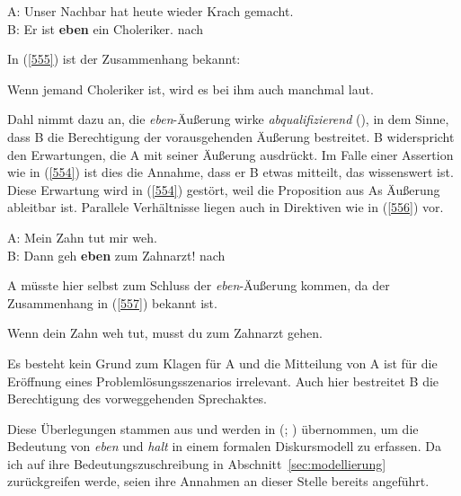 \begin{exe}
	\ex\label{554} 
	A: Unser Nachbar hat heute wieder Krach gemacht.\\
	B: Er ist \textbf{eben} ein Choleriker.		
	\hfill\hbox{nach \citet[98]{Dahl1988}} 
\end{exe}
In (\ref{555}) ist der Zusammenhang bekannt:
\begin{exe}
	\ex\label{555} 
	Wenn jemand Choleriker ist, wird es bei ihm auch manchmal laut.
\end{exe}
Dahl nimmt dazu an, die \textit{eben}-Äußerung wirke \textit{abqualifizierend} (\citeyear[100]{Dahl1988}), in dem Sinne, dass B die Berechtigung der vorausgehenden Äußerung bestreitet. B widerspricht den Erwartungen, die A mit seiner Äußerung ausdrückt. Im Falle einer Assertion wie in (\ref{554}) ist dies die Annahme, dass er B etwas mitteilt, das wissenswert ist. Diese Erwartung wird in (\ref{554}) gestört, weil die Proposition aus As Äußerung ableitbar ist. Parallele Verhältnisse liegen auch in Direktiven wie in (\ref{556}) vor.
\begin{exe}
	\ex\label{556} 
	A: Mein Zahn tut mir weh.\\
	B: Dann geh \textbf{eben} zum Zahnarzt!
	\hfill\hbox{nach \citet[101]{Dahl1988}} 
\end{exe}
A müsste hier selbst zum Schluss der \textit{eben}-Äußerung kommen, da der Zusammenhang in (\ref{557}) bekannt ist.
\begin{exe}
	\ex\label{557} 
	Wenn dein Zahn weh tut, musst du zum Zahnarzt gehen.
\end{exe}
Es besteht kein Grund zum Klagen für A und die Mitteilung von A ist für die Eröffnung eines Problemlösungsszenarios irrelevant. Auch hier bestreitet B die Berechtigung des vorweggehenden Sprechaktes.

Diese Überlegungen stammen aus \citet[98--101]{Dahl1988} und werden in \citeauthor{Karagjosova2003} (\citeyear[340]{Karagjosova2003}; \citeyear[202--220]{Karagjosova2004}) übernommen, um die Bedeutung von \textit{eben} und \textit{halt} in einem formalen Diskursmodell zu erfassen. Da ich auf ihre Bedeutungszuschreibung in Abschnitt~\ref{sec:modellierung} zurückgreifen werde, seien ihre Annahmen an dieser Stelle bereits angeführt.

